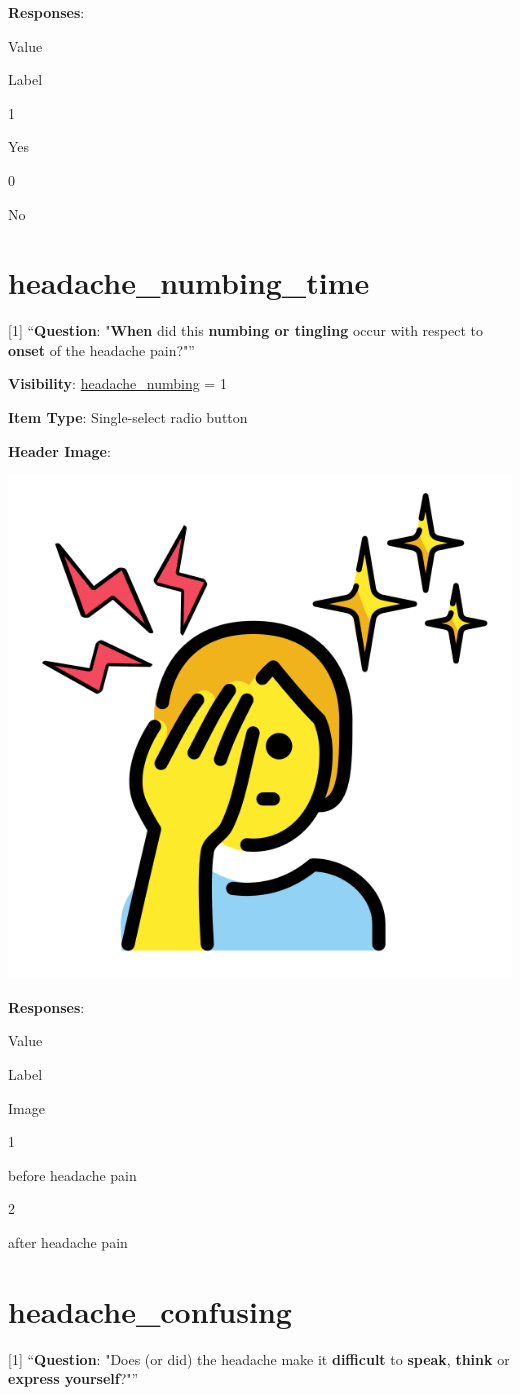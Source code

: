 \documentclass[]{book}
\begin{document}
\textbf{Responses}:

Value

Label

1

Yes

0

No

\hypertarget{headache_numbing_time}{%
\section{headache\_numbing\_time}\label{headache_numbing_time}}

{[}1{]} ``\textbf{Question}: "\textbf{When} did this \textbf{numbing or tingling} occur with respect to \textbf{onset} of the headache pain?"''

\textbf{Visibility}: \protect\hyperlink{headache_numbing}{headache\_numbing} = 1

\textbf{Item Type}: Single-select radio button

\textbf{Header Image}:

\begin{flushleft}\includegraphics[width=0.33\linewidth]{downloadFigs4latex_NIMH_Applet_Codebook/headache_numbing_time_headerImg} \end{flushleft}

\textbf{Responses}:

Value

Label

Image

1

before headache pain

2

after headache pain

\hypertarget{headache_confusing}{%
\section{headache\_confusing}\label{headache_confusing}}

{[}1{]} ``\textbf{Question}: "Does (or did) the headache make it \textbf{difficult} to \textbf{speak}, \textbf{think} or \textbf{express yourself}?"''
\end{document}
